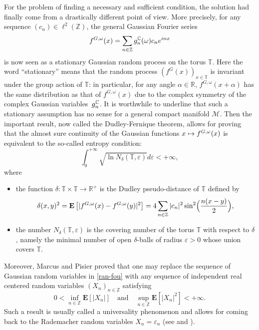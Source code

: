 \documentclass[11pt]{article}
\def\mto{\mathchoice{\longmapsto}{\mapsto}{\mapsto}{\mapsto}}
\theoremstyle{theorem}
\theoremstyle{definition}
\newcommand\R{\mathbb{R}}
\newcommand\E{\mathbf{E}}
\newcommand\Z{\mathbb{Z}}
\newcommand\T{\mathbb{T}}
\newcommand\ep{\varepsilon}
\begin{document}
For the problem of finding a necessary and sufficient condition, the solution had finally come from a drastically different point of view. More precisely, for any sequence $(c_n)\in \ell^2(\Z)$, the general Gaussian Fourier series
\begin{equation}\label{ran-fou}
f^{G,\omega}(x)=\sum_{n\in \Z} g_n^{\C}(\omega) c_n e^{inx}
\end{equation}
is now seen as a stationary Gaussian random process on the torus $\mathbb{T}$.
Here the word ``stationary'' means that the random process $(f^{G}(x))_{x\in \mathbb{T}}$ is invariant under the group action of $\mathbb{T}$: in particular, for any angle $\alpha \in \R$, $f^{G,\omega}(x+\alpha)$ has the same distribution as that of $f^{G,\omega}(x)$ due to the complex symmetry of the complex Gaussian variables~$g_n^{\mathbb{C}}$.
It is worthwhile to underline that such a stationary assumption has no sense for a general compact manifold $\mathcal{M}$.
Then the important result, now called the Dudley-Fernique theorem, allows for proving that the almost sure continuity of the Gaussian functions
$x\mto f^{G,\omega}(x)$ is equivalent to the so-called entropy condition:
\begin{equation}\label{entrop}
\int_{0}^{+\infty} \sqrt{\ln N_{\delta}(\T,\ep)} d\ep<+\infty,
\end{equation}
\enlargethispage{-2\baselineskip}%
where
\begin{itemize}
\item the function $\delta:\mathbb{T}\times \mathbb{T}\to \R^+$ is the Dudley pseudo-distance of $\mathbb{T}$ defined by\vspace*{-3pt}
\begin{equation*}
\delta(x,y)^2 =\E\left[| f^{G,\omega}(x)-f^{G,\omega}(y)|^2\right]=4\sum_{n\in \Z} |c_n|^2 \sin^2\Bigl(\frac{n(x-y)}{2}\Bigr),
\end{equation*}
\item the number $N_{\delta}(\T,\ep)$ is the covering number of the torus $\mathbb{T}$ with respect to $\delta$, namely the minimal number of open $\delta$-balls of radius $\ep>0$ whose union covers $\mathbb{T}$.
\end{itemize}
Moreover, Marcus and Pisier proved that one may replace the sequence of Gaussian random variables in \eqref{ran-fou} with any sequence of independent real centered random variables $(X_n)_{n\in \Z}$ satisfying\vspace*{-3pt}
\begin{equation*}
0<\inf_{n\in \Z}\E[|X_n|] \quad \text{and} \quad \sup_{n\in \Z} \E[|X_n|^2]<+\infty.
\end{equation*}
Such a result is usually called a universality phenomenon and allows for coming back to the Rademacher random variables $X_n=\ep_n$ (see \cite[p.\,7--9]{pisier1981} and \cite[p.\,28, Cor.\,7.3]{pisier1977}).
\end{document}
